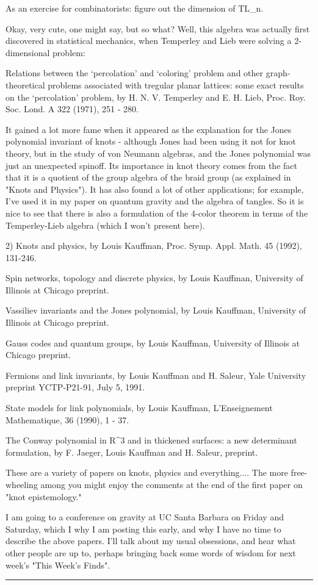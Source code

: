 As an exercise for combinatorists: figure out the dimension of TL_n.

Okay, very cute, one might say, but so what?  Well, this algebra was
actually first discovered in statistical mechanics, when Temperley and
Lieb were solving a 2-dimensional problem:

Relations between the `percolation' and `coloring' problem and other
graph-theoretical problems associated with tregular planar lattices:
some exact results on the `percolation' problem, by H. N. V. Temperley
and E. H. Lieb, Proc. Roy. Soc. Lond. A 322 (1971), 251 - 280.

It gained a lot more fame when it appeared as the explanation
for the Jones polynomial invariant of knots - although Jones had been
using it not for knot theory, but in the study of von Neumann algebras,
and the Jones polynomial was just an unexpected spinoff.  Its importance
in knot theory comes from the fact that it is a quotient of the group
algebra of the braid group (as explained in "Knots and Physics").  
It has also found a lot of other applications; for example, I've used it in
my paper on quantum gravity and the algebra of tangles.  So it is nice to 
see that there is also a formulation of the 4-color theorem in terms of
the Temperley-Lieb algebra (which I won't present here).

2)  Knots and physics, by Louis Kauffman, Proc. Symp. Appl. Math. 45
(1992), 131-246.

Spin networks, topology and discrete physics, by Louis Kauffman, 
University of Illinois at Chicago preprint.  

Vassiliev invariants and the Jones polynomial, by Louis Kauffman,
University of Illinois at Chicago preprint.  

Gauss codes and quantum groups, by Louis Kauffman, University of
Illinois at Chicago preprint.   

Fermions and link invariants, by  Louis Kauffman
and H. Saleur, Yale University preprint YCTP-P21-91, July 5, 1991.

State models for link polynomials, by Louis Kauffman, L'Enseignement
Mathematique, 36 (1990), 1 - 37.

The Conway polynomial in R^3 and in thickened surfaces: a new
determinant formulation, by F. Jaeger, Louis Kauffman
and H. Saleur, preprint.  


These are a variety of papers on knots, physics and everything.... The
more free-wheeling among you might enjoy the comments at the end of the
first paper on "knot epistemology."

I am going to a conference on gravity at UC Santa Barbara on
Friday and Saturday, which I why I am posting this early, and why I have
no time to describe the above papers.   I'll talk about my usual
obsessions, and hear what other people are up to, perhaps bringing back
some words of wisdom for next week's "This Week's Finds".
\par\noindent\rule{\textwidth}{0.4pt}

